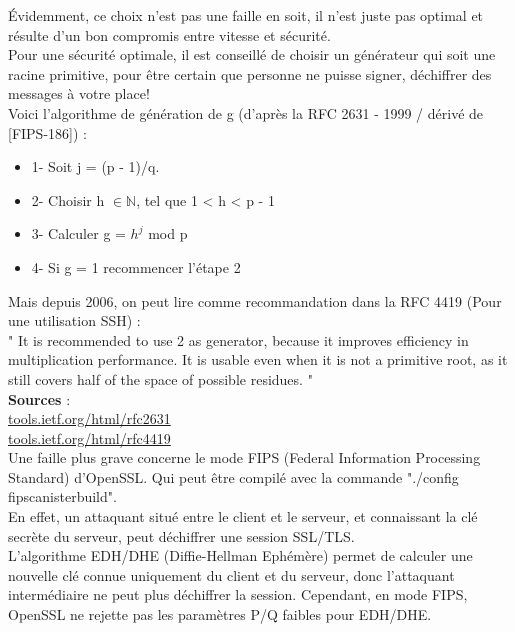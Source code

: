 \documentclass{article}
\begin{document}
	Évidemment, ce choix n'est pas une faille en soit, il n'est juste pas 
	optimal et résulte d'un bon compromis entre vitesse et sécurité.\\
	
	Pour une sécurité optimale, il est conseillé de choisir un générateur qui 
	soit une racine primitive, pour être certain que personne ne puisse 
	signer, déchiffrer des messages à votre place!\\

	Voici l'algorithme de génération de g (d'après la RFC 2631 - 1999 / dérivé 
	de [FIPS-186]) : \\
	\begin{itemize}
	\item 1- Soit j = (p - 1)/q.
	\item 2- Choisir h $\in \mathbb{N}$, tel que 1 < h < p - 1
	\item 3- Calculer g = $h^j$ mod p
	\item 4- Si g = 1 recommencer l'étape 2\\
	\end{itemize}

	Mais depuis 2006, on peut lire comme recommandation dans la RFC 4419 (Pour 
	une utilisation SSH) : \\
	" It is recommended to use 2 as generator, because it improves
	efficiency in multiplication performance.  It is usable even when it
	is not a primitive root, as it still covers half of the space of
	possible residues. "\\
	
	
	\textbf{Sources} : \\
	\href{http://tools.ietf.org/html/rfc2631}{tools.ietf.org/html/rfc2631}\\
	\href{http://tools.ietf.org/html/rfc4419}{tools.ietf.org/html/rfc4419}\\

	Une faille plus grave concerne le mode FIPS (Federal Information 
	Processing Standard) d'OpenSSL.
	Qui peut être compilé avec la commande "./config fipscanisterbuild". \\

	En effet, un attaquant situé entre le client et le serveur, et connaissant
	la clé secrète du serveur, peut déchiffrer une session SSL/TLS. \\
	
	L'algorithme EDH/DHE (Diffie-Hellman Ephémère) permet de calculer 
	une nouvelle clé connue uniquement du client et du serveur, donc l'attaquant 
	intermédiaire ne peut plus déchiffrer la session.
	Cependant, en mode FIPS, OpenSSL ne rejette pas les paramètres P/Q faibles 
	pour EDH/DHE.
\end{document}
